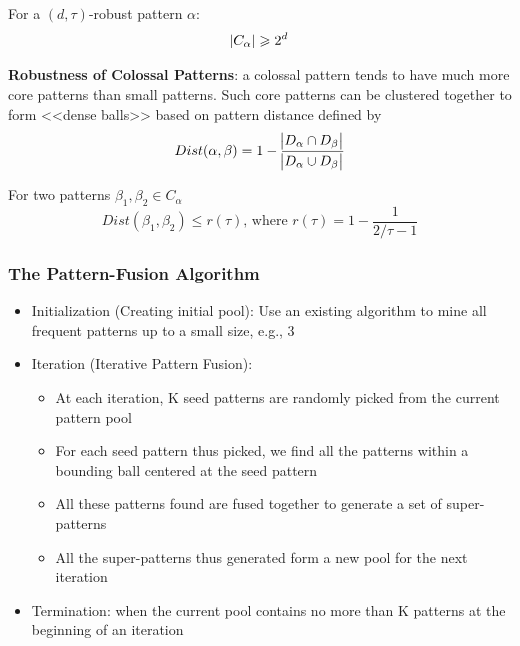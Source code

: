 \begin{theorem}
For a $(d, \tau)$-robust pattern $\alpha$:
\begin{equation*}
\abs{C_\alpha} \geqslant 2^d
\end{equation*}
\end{theorem}

\textbf{Robustness of Colossal Patterns}: a colossal pattern tends to have
much more core patterns than small patterns. Such core patterns can be clustered together to form <<dense balls>> based on pattern distance defined by 
\begin{equation*}
Dist(\alpha, \beta)=1-\frac{\abs{D_\alpha \cap D_\beta}}{\abs{D_\alpha \cup D_\beta}}
\end{equation*}

\begin{theorem}
For two patterns $\beta_1, \beta_2 \in C_\alpha$ 
\begin{equation*}
Dist(\beta_1, \beta_2) \leqslant r(\tau)\text{, where }r(\tau)=1-\frac{1}{2/\tau-1}
\end{equation*}
\end{theorem}

\subsubsection{The Pattern-Fusion Algorithm}
\begin{itemize}
\item Initialization (Creating initial pool): Use an existing algorithm to mine all frequent patterns up to a small size, e.g., 3
\item Iteration (Iterative Pattern Fusion):
\begin{itemize}
\item At each iteration, K seed patterns are randomly picked from the current pattern
pool
\item For each seed pattern thus picked, we find all the patterns within a bounding ball centered at the seed pattern
\item All these patterns found are fused together to generate a set of super-patterns
\item All the super-patterns thus generated form a new pool for the next iteration
\end{itemize}
\item Termination: when the current pool contains no more than K patterns at the beginning of an iteration
\end{itemize}

